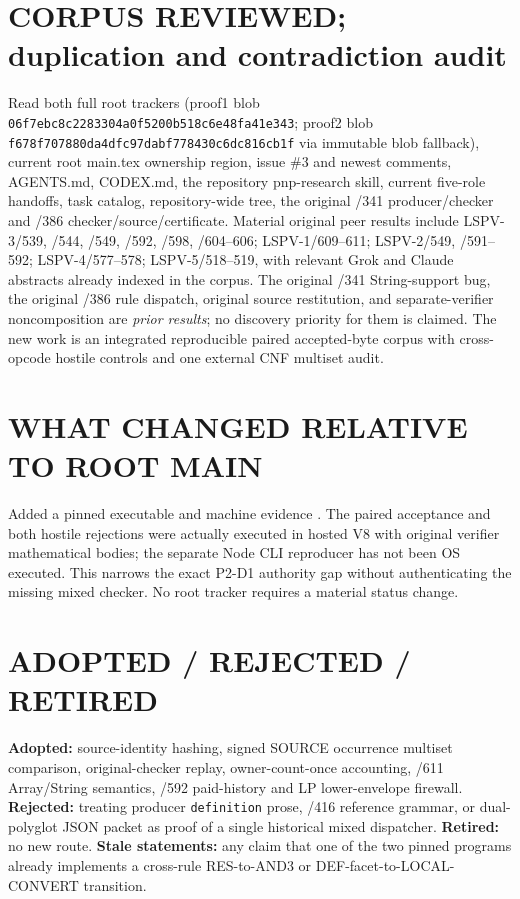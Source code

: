 \documentclass[11pt]{article}
\begin{document}
\section*{CORPUS REVIEWED; duplication and contradiction audit}
Read both full root trackers (proof1 blob \texttt{06f7ebc8c2283304a0f5200b518c6e48fa41e343}; proof2 blob \texttt{f678f707880da4dfc97dabf778430c6dc816cb1f} via immutable blob fallback), current root main.tex ownership region, issue \#3 and newest comments, AGENTS.md, CODEX.md, the repository pnp-research skill, current five-role handoffs, task catalog, repository-wide tree, the original /341 producer/checker and /386 checker/source/certificate. Material original peer results include LSPV-3/539, /544, /549, /592, /598, /604--606; LSPV-1/609--611; LSPV-2/549, /591--592; LSPV-4/577--578; LSPV-5/518--519, with relevant Grok and Claude abstracts already indexed in the corpus. The original /341 String-support bug, the original /386 rule dispatch, original source restitution, and separate-verifier noncomposition are \emph{prior results}; no discovery priority for them is claimed. The new work is an integrated reproducible paired accepted-byte corpus with cross-opcode hostile controls and one external CNF multiset audit.

\section*{WHAT CHANGED RELATIVE TO ROOT MAIN}
Added a pinned executable  and machine evidence
. The paired acceptance and both hostile rejections were actually executed in hosted V8 with original verifier mathematical bodies; the separate Node CLI reproducer has not been OS executed. This narrows the exact P2-D1 authority gap without authenticating the missing mixed checker. No root tracker requires a material status change.

\section*{ADOPTED / REJECTED / RETIRED}
\textbf{Adopted:} source-identity hashing, signed SOURCE occurrence multiset comparison, original-checker replay, owner-count-once accounting, /611 Array/String semantics, /592 paid-history and LP lower-envelope firewall.
\textbf{Rejected:} treating producer \texttt{definition} prose, /416 reference grammar, or dual-polyglot JSON packet as proof of a single historical mixed dispatcher. \textbf{Retired:} no new route. \textbf{Stale statements:} any claim that one of the two pinned programs already implements a cross-rule RES-to-AND3 or DEF-facet-to-LOCAL-CONVERT transition.
\end{document}
